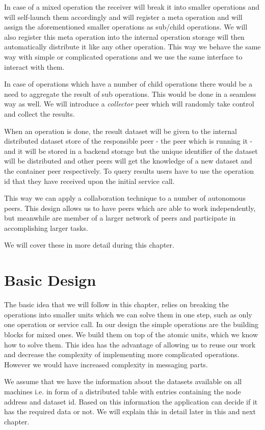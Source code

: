 In case of a mixed operation the receiver will break it into smaller operations and will self-launch them accordingly and
will register a meta operation and will assign the aforementioned smaller operations as sub/child operations. We will
also register this meta operation into the internal operation storage will then automatically distribute it like any other
operation. This way we behave the same way with simple or complicated operations and we use the same interface to interact
with them.

In case of operations which have a number of child operations there would be a need to aggregate the result of sub operations.
This would be done in a seamless way as well. We will introduce a \textit{collector} peer which will randomly take control
and collect the results.

When an operation is done, the result dataset will be given to the internal distributed dataset store of the responsible
peer - the peer which is running it - and it will be stored in a backend storage but the unique identifier of the dataset
will be distributed and other peers will get the knowledge of a new dataset and the container peer respectively. 
To query results users have to use the operation id that they have received upon the initial service call. 

This way we can apply a collaboration technique to a number of autonomous peers. 
This design allows us to have peers which are able to work independently, 
but meanwhile are member of a larger network of peers and participate in accomplishing larger tasks.

We will cover these in more detail during this chapter.

\section{Basic Design}
The basic idea that we will follow in this chapter, relies on breaking the operations into smaller units which
we can solve them in one step, such as only one operation or service call. 
In our design the simple operations are the building blocks for mixed ones.
We build them on top of the atomic units, which we know how to solve them.
This idea has the advantage of allowing us to reuse our work and decrease the complexity of implementing
more complicated operations. However we would have increased complexity in messaging parts.

We assume that we have the information about the datasets
available on all machines i.e. in form of a distributed table
with entries containing the node address and dataset id. Based on this
information the application can decide if it has the required data or
not. We will explain this in detail later in this and next chapter.

